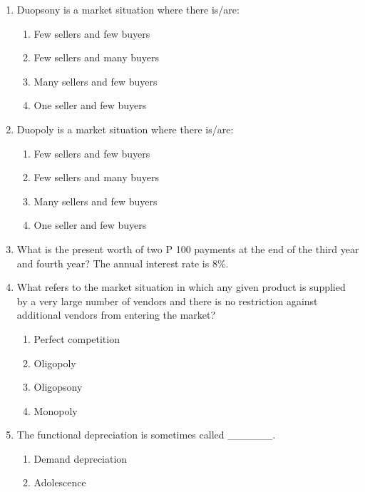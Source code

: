 \documentclass[11pt,a4paper]{article}
\begin{document}
\begin{enumerate}
\item{Duopsony is a market situation where there is/are:}
\begin{enumerate}[label=\Alph*.]
\item{Few sellers and few buyers}
\item{Few sellers and many buyers}
\item{Many sellers and few buyers}
\item{One seller and few buyers}
\end{enumerate}
\item{Duopoly is a market situation where there is/are:}
\begin{enumerate}[label=\Alph*.]
\item{Few sellers and few buyers}
\item{Few sellers and many buyers}
\item{Many sellers and few buyers}
\item{One seller and few buyers}
\end{enumerate}
\item{What is the present worth of two P 100 payments at the end of the third year and fourth year? The annual interest rate is 8\%.}
\\
\item{What refers to the market situation in which any given product is supplied by a very large number of vendors and there is no restriction against additional vendors from entering the market?}
\begin{enumerate}[label=\Alph*.]
\item{Perfect competition}
\item{Oligopoly}
\item{Oligopsony}
\item{Monopoly}
\end{enumerate}
\item{The functional depreciation is sometimes called \_\_\_\_\_\_.}
\begin{enumerate}[label=\Alph*.]
\item{Demand depreciation}
\item{Adolescence}

\end{enumerate}
\end{enumerate}
\end{document}
